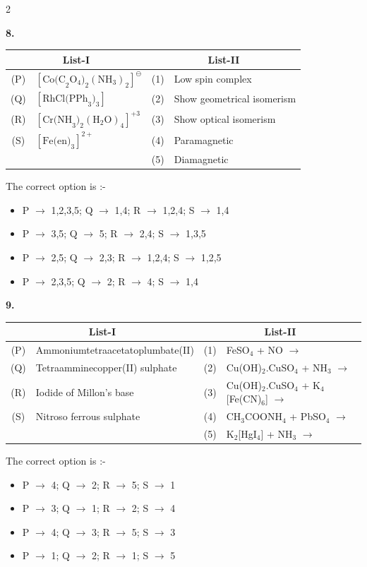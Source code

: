 \documentclass[10pt]{extarticle}
\newcommand{\qn}[1]{\par\smallskip\noindent\textbf{#1.}~}
\newenvironment{qoptions}{\begin{itemize}[leftmargin=1.8em,itemsep=1pt,topsep=2pt,label={}]}{\end{itemize}}
\newcommand{\opt}[2]{\item[(#1)] #2}
\begin{document}
\begin{multicols}{2}
\qn{8}\par\nobreak
\begin{center}\small\setlength{\tabcolsep}{3pt}
\begin{tabular}{|c|p{3.4cm}|c|p{2.1cm}|}
\hline
\multicolumn{2}{|c|}{\textbf{List-I}} & \multicolumn{2}{c|}{\textbf{List-II}} \\
\hline
(P) & $\left[\text{Co(C}_2\text{O}_4)_2(\text{NH}_3)_2\right]^{\ominus}$ & (1) & Low spin complex \\
\hline
(Q) & $\left[\text{RhCl(PPh}_3)_3\right]$ & (2) & Show geometrical isomerism \\
\hline
(R) & $\left[\text{Cr(NH}_3)_2(\text{H}_2\text{O})_4\right]^{+3}$ & (3) & Show optical isomerism \\
\hline
(S) & $\left[\text{Fe(en)}_3\right]^{2+}$ & (4) & Paramagnetic \\
\hline
 & & (5) & Diamagnetic \\
\hline
\end{tabular}
\end{center}
The correct option is :-
\begin{qoptions}
\opt{A}{P $\to$ 1,2,3,5; Q $\to$ 1,4; R $\to$ 1,2,4; S $\to$ 1,4}
\opt{B}{P $\to$ 3,5; Q $\to$ 5; R $\to$ 2,4; S $\to$ 1,3,5}
\opt{C}{P $\to$ 2,5; Q $\to$ 2,3; R $\to$ 1,2,4; S $\to$ 1,2,5}
\opt{D}{P $\to$ 2,3,5; Q $\to$ 2; R $\to$ 4; S $\to$ 1,4}
\end{qoptions}

\qn{9}\par\nobreak
\begin{center}\small\setlength{\tabcolsep}{3pt}
\begin{tabular}{|c|p{2.9cm}|c|p{2.8cm}|}
\hline
\multicolumn{2}{|c|}{\textbf{List-I}} & \multicolumn{2}{c|}{\textbf{List-II}} \\
\hline
(P) & Ammonium\-tetra\-acetato\-plumbate(II) & (1) & FeSO$_4$ + NO $\rightarrow$ \\
\hline
(Q) & Tetra\-ammine\-copper(II) sulphate & (2) & Cu(OH)$_2$.CuSO$_4$ + NH$_3$ $\rightarrow$ \\
\hline
(R) & Iodide of Millon's base & (3) & Cu(OH)$_2$.CuSO$_4$ + K$_4$[Fe(CN)$_6$] $\rightarrow$ \\
\hline
(S) & Nitroso ferrous sulphate & (4) & CH$_3$COONH$_4$ + PbSO$_4$ $\rightarrow$ \\
\hline
 & & (5) & K$_2$[HgI$_4$] + NH$_3$ $\rightarrow$ \\
\hline
\end{tabular}
\end{center}
The correct option is :-
\begin{qoptions}
\opt{A}{P $\to$ 4; Q $\to$ 2; R $\to$ 5; S $\to$ 1}
\opt{B}{P $\to$ 3; Q $\to$ 1; R $\to$ 2; S $\to$ 4}
\opt{C}{P $\to$ 4; Q $\to$ 3; R $\to$ 5; S $\to$ 3}
\opt{D}{P $\to$ 1; Q $\to$ 2; R $\to$ 1; S $\to$ 5}
\end{qoptions}


\end{multicols}
\end{document}
